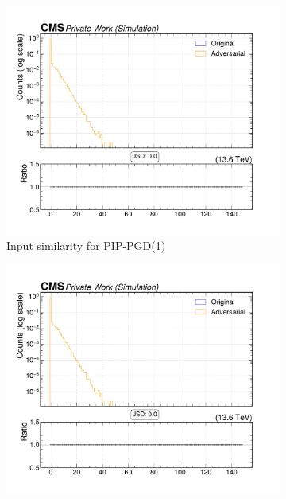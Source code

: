 \begin{figure}[htbp]
  \centering
  \begin{subfigure}[t]{0.32\textwidth}
    \includegraphics[width=\linewidth]{media/output/features/compare/combined_it_1/cmp_vtx_arr_sv_chi2.pdf}
    \caption*{Input similarity for PIP-PGD(1)}
  \end{subfigure}\hfill
  \begin{subfigure}[t]{0.32\textwidth}
    \includegraphics[width=\linewidth]{media/output/features/compare/combined_it_2/cmp_vtx_arr_sv_chi2.pdf}

\end{subfigure}
\end{figure}
